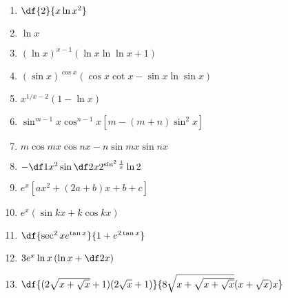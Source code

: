\begin{enumerate}
  \item $\df{2}{x\ln x^2}$
  \item $\ln x$
  \item $(\ln x)^{x-1}(\ln x\ln\ln x+1)$
  \item $(\sin x)^{\cos x}(\cos x\cot x-\sin x\ln\sin x)$
  \item $x^{1/x-2}(1-\ln x)$
  \item $\sin^{m-1}x\cos^{n-1}x[m-(m+n)\sin^2x]$
  \item $m\cos mx\cos nx-n\sin mx\sin nx$
  \item $-\df1{x^2}\sin\df2x2^{\sin^2\frac1x}\ln2$
  \item $e^x[ax^2+(2a+b)x+b+c]$
  \item $e^x(\sin kx+k\cos kx)$
  \item $\df{\sec^2xe^{\tan x}}{1+e^{2\tan x}}$
  \item $3e^x\ln x\left(\ln x+\df2x\right)$
  \item $\df{(2\sqrt{x+\sqrt x}+1)(2\sqrt x+1)}{8\sqrt{x+\sqrt{x+\sqrt
  x}}(x+\sqrt x)x}$
\end{enumerate}
